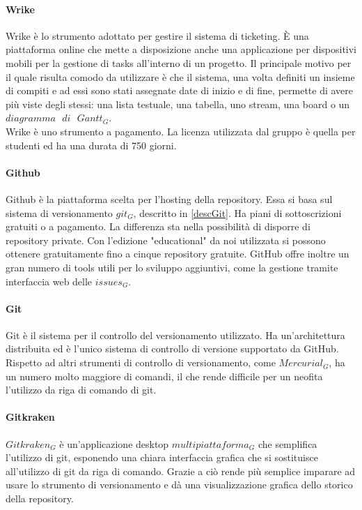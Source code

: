 		\paragraph{Wrike} \Spazio
		Wrike è lo strumento adottato per gestire il sistema di ticketing. È una piattaforma online che mette a disposizione anche una applicazione per dispositivi mobili per la gestione di tasks all'interno di un progetto. Il principale motivo per il quale risulta comodo da utilizzare è che il sistema, una volta definiti un insieme di compiti e ad essi sono stati  assegnate date di inizio e di fine, permette di avere più viste degli stessi: una lista testuale, una tabella, uno stream, una board o un $diagramma\text{ }di\text{ }Gantt_G$. \\ Wrike è uno strumento a pagamento. La licenza utilizzata dal gruppo è quella per studenti ed ha una durata di 750 giorni.
		
		\paragraph{Github} \Spazio
		Github è la piattaforma scelta per l'hosting della repository. Essa si basa sul sistema di versionamento $git_G$, descritto in \ref{descGit}. Ha piani di sottoscrizioni gratuiti o a pagamento. La differenza sta nella possibilità di disporre di repository private. Con l'edizione "educational" da noi utilizzata si possono ottenere gratuitamente fino a cinque repository gratuite. GitHub offre inoltre un gran numero di tools utili per lo sviluppo aggiuntivi, come la gestione tramite interfaccia web delle $issues_G$.
		
		\paragraph{Git} \Spazio
		Git\label{descGit} è il sistema per il controllo del versionamento utilizzato. Ha un'architettura distribuita ed è l'unico sistema di controllo di versione supportato da GitHub. Rispetto ad altri strumenti di controllo di versionamento, come $Mercurial_G$, ha un numero molto maggiore di comandi, il che rende difficile per un neofita l'utilizzo da riga di comando di git.
		
		\paragraph{Gitkraken} \Spazio
		$Gitkraken_G$ è un'applicazione desktop $multipiattaforma_G$ che semplifica l'utilizzo di git, esponendo una chiara interfaccia grafica che si sostituisce all'utilizzo di git da riga di comando. Grazie a ciò rende più semplice imparare ad usare lo strumento di versionamento e dà una visualizzazione grafica dello storico della repository.
		
